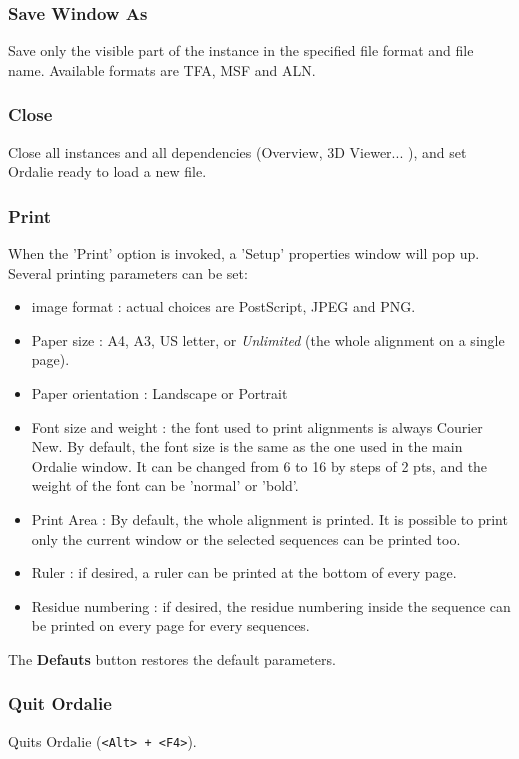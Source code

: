 \documentclass[a4paper]{article}
\begin{document}
\subsubsection{Save Window As}
Save only the visible part of the instance in the specified file format and file name. Available formats are TFA, MSF and ALN.

\subsubsection{Close}
Close all instances and all dependencies (Overview, 3D Viewer... ), and set Ordalie ready to load a new file.

\subsubsection{Print}
When the 'Print' option is invoked, a 'Setup' properties window will pop up. Several printing parameters can be set:
\begin{itemize}
\item image format : actual choices are PostScript, JPEG and PNG.
\item Paper size : A4, A3, US letter, or \textit{Unlimited} (the whole alignment on a single page).
\item Paper orientation : Landscape or Portrait
\item Font size and weight : the font used to print alignments is always Courier New. By default, the font size is the same as the one used in the main Ordalie window. It can be changed from 6 to 16 by steps of 2 pts, and the weight of the font can be 'normal' or 'bold'.
\item Print Area : By default, the whole alignment is printed. It is possible to print only the current window or the selected sequences can be printed too.
\item Ruler : if desired, a ruler can be printed at the bottom of every page.
\item Residue numbering : if desired, the residue numbering inside the sequence can be printed on every page for every sequences.
\end{itemize}
The \textbf{Defauts} button restores the default parameters.

\subsubsection{Quit Ordalie}
Quits Ordalie (\texttt{<Alt> + <F4>}).
\end{document}
